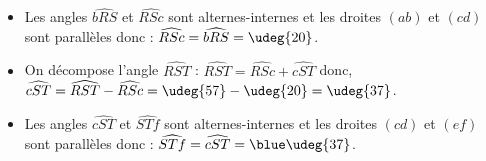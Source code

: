   \begin{itemize}
      \item Les angles $\widehat{bRS}$ et $\widehat{RSc}$ sont alternes-internes et les droites $(ab)$ et $(cd)$ sont parallèles donc : $\widehat{RSc} =\widehat{bRS} =\udeg{20}$.
      \item On décompose l'angle $\widehat{RST}$ : $\widehat{RST} =\widehat{RSc}+\widehat{cST}$ donc, $\widehat{cST} =\widehat{RST} -\widehat{RSc} =\udeg{57}-\udeg{20} =\udeg{37}$.
      \item Les angles $\widehat{cST}$ et $\widehat{STf}$ sont alternes-internes et les droites $(cd)$ et $(ef)$ sont parallèles donc : $\widehat{STf} =\widehat{cST} =\blue \udeg{37}$.
   \end{itemize}
